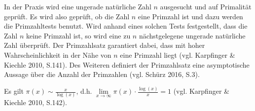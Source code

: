 In der Praxis wird eine ungerade natürliche Zahl $n$
ausgesucht und auf Primalität geprüft. Es wird also geprüft,
ob die Zahl $n$ eine Primzahl ist und dazu werden die
Primzahltests benutzt. Wird anhand eines solchen Tests
festgestellt, dass die Zahl $n$ keine Primzahl ist, so
wird eine zu $n$ nächstgelegene ungerade natürliche Zahl
überprüft. Der Primzahlsatz garantiert dabei, dass mit
hoher Wahrscheinlichkeit in der Nähe von $n$ eine Primzahl
liegt (vgl. Karpfinger \& Kiechle 2010, S.141).
Des Weiteren definiert der Primzahlsatz eine asymptotische
Aussage über die Anzahl der Primzahlen (vgl. Schürz 2016, S.3).

\begin{theorem}[Primzahlsatz]
Es gilt \( \pi (x) \sim \frac{x}{\log(x)}\), d.h.
\( \lim\limits_{x\to\infty} \pi(x)\cdot \frac{\log(x)}{x} = 1 \)
(vgl. Karpfinger \& Kiechle 2010, S.142).
\end{theorem}

